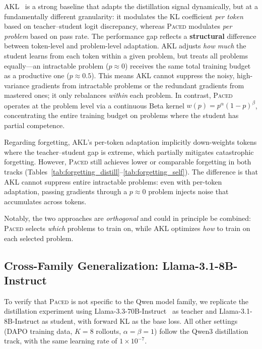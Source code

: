\documentclass{article}
\begin{document}
AKL~\citep{wu2025akl} is a strong baseline that adapts the distillation signal dynamically, but at a fundamentally different granularity: it modulates the KL coefficient \emph{per token} based on teacher--student logit discrepancy, whereas \textsc{Paced} modulates \emph{per problem} based on pass rate.
The performance gap reflects a \textbf{structural} difference between token-level and problem-level adaptation.
AKL adjusts \emph{how much} the student learns from each token within a given problem, but treats all problems equally---an intractable problem ($p \approx 0$) receives the same total training budget as a productive one ($p \approx 0.5$).
This means AKL cannot suppress the noisy, high-variance gradients from intractable problems or the redundant gradients from mastered ones; it only rebalances \emph{within} each problem.
In contrast, \textsc{Paced} operates at the problem level via a continuous Beta kernel $w(p)=p^\alpha(1{-}p)^\beta$, concentrating the entire training budget on problems where the student has partial competence.

Regarding forgetting, AKL's per-token adaptation implicitly down-weights tokens where the teacher--student gap is extreme, which partially mitigates catastrophic forgetting. However, \textsc{Paced} still achieves lower or comparable forgetting in both tracks (Tables~\ref{tab:forgetting_distill}--\ref{tab:forgetting_self}). The difference is that AKL cannot suppress entire intractable problems: even with per-token adaptation, passing gradients through a $p \approx 0$ problem injects noise that accumulates across tokens.

Notably, the two approaches are \emph{orthogonal} and could in principle be combined: \textsc{Paced} selects \emph{which} problems to train on, while AKL optimizes \emph{how} to train on each selected problem.

\subsection{Cross-Family Generalization: Llama-3.1-8B-Instruct}
\label{app:llama}

To verify that \textsc{Paced} is not specific to the Qwen model family, we replicate the distillation experiment using Llama-3.3-70B-Instruct~\citep{grattafiori2024llama3} as teacher and Llama-3.1-8B-Instruct as student, with forward KL as the base loss. All other settings (DAPO training data, $K{=}8$ rollouts, $\alpha{=}\beta{=}1$) follow the Qwen3 distillation track, with the same learning rate of $1 \times 10^{-7}$.
\end{document}
